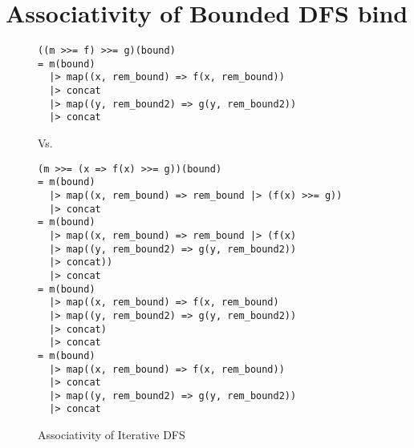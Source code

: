 \chapter{Associativity of Bounded DFS bind}
\label{sec:BDFSbindassoc}
\begin{figure}
\begin{verbatim}
((m >>= f) >>= g)(bound)
= m(bound) 
  |> map((x, rem_bound) => f(x, rem_bound))
  |> concat
  |> map((y, rem_bound2) => g(y, rem_bound2))
  |> concat
\end{verbatim}
Vs.
\begin{verbatim}
(m >>= (x => f(x) >>= g))(bound)
= m(bound)
  |> map((x, rem_bound) => rem_bound |> (f(x) >>= g))
  |> concat
= m(bound)
  |> map((x, rem_bound) => rem_bound |> (f(x) 
  |> map((y, rem_bound2) => g(y, rem_bound2)) 
  |> concat))
  |> concat
= m(bound)
  |> map((x, rem_bound) => f(x, rem_bound) 
  |> map((y, rem_bound2) => g(y, rem_bound2))
  |> concat)
  |> concat
= m(bound)
  |> map((x, rem_bound) => f(x, rem_bound)) 
  |> concat
  |> map((y, rem_bound2) => g(y, rem_bound2))
  |> concat
\end{verbatim}
\caption{Associativity of Iterative DFS }
\end{figure}
